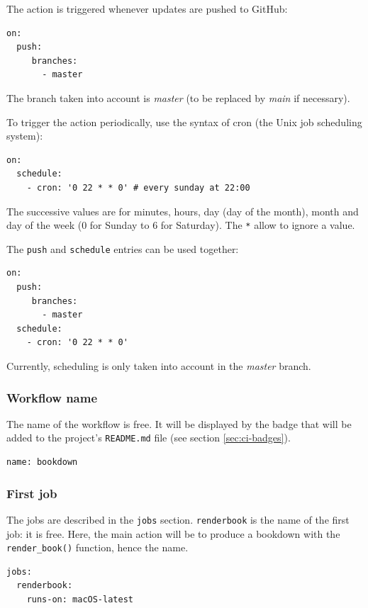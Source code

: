 \documentclass[
  12pt,
  american,
  a4paper,
  extrafontsizes,onecolumn,openright
  ]{memoir}
\begin{document}
The action is triggered whenever updates are pushed to GitHub:

\begin{verbatim}
on:
  push:
     branches:
       - master
\end{verbatim}

The branch taken into account is \emph{master} (to be replaced by \emph{main} if necessary).

To trigger the action periodically, use the syntax of cron (the Unix job scheduling system):

\begin{verbatim}
on:
  schedule:
    - cron: '0 22 * * 0' # every sunday at 22:00
\end{verbatim}

The successive values are for minutes, hours, day (day of the month), month and day of the week (0 for Sunday to 6 for Saturday).
The \texttt{*} allow to ignore a value.

The \texttt{push} and \texttt{schedule} entries can be used together:

\begin{verbatim}
on:
  push:
     branches:
       - master
  schedule:
    - cron: '0 22 * * 0'
\end{verbatim}

Currently, scheduling is only taken into account in the \emph{master} branch.

\subsubsection{Workflow name}\label{workflow-name}

The name of the workflow is free.
It will be displayed by the badge that will be added to the project's \texttt{README.md} file (see section \ref{sec:ci-badges}).

\begin{verbatim}
name: bookdown
\end{verbatim}

\subsubsection{First job}\label{first-job}

The jobs are described in the \texttt{jobs} section.
\texttt{renderbook} is the name of the first job: it is free.
Here, the main action will be to produce a bookdown with the \texttt{render\_book()} function, hence the name.

\begin{verbatim}
jobs:
  renderbook:
    runs-on: macOS-latest
\end{verbatim}
\end{document}
